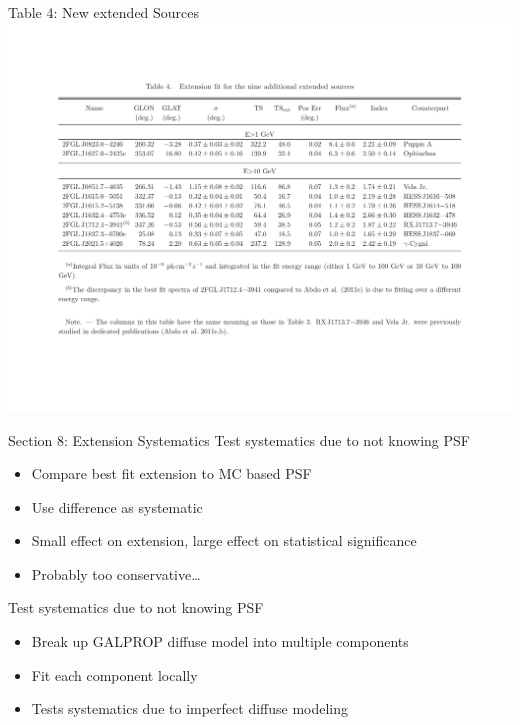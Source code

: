 \documentclass[12pt]{beamer}
\begin{document}
\begin{frame}{Table 4: New extended Sources}
    \includegraphics[scale=0.50]{plots/new_extended.pdf}
\end{frame}


\begin{frame}{Section 8: Extension Systematics}
  Test systematics due to not knowing PSF
  \begin{itemize}
    \item Compare best fit extension to 
      MC based PSF
    \item Use difference as systematic
    \item Small effect on extension, large effect on statistical 
      significance
    \item Probably too conservative\dots
  \end{itemize}
  Test systematics due to not knowing PSF
  \begin{itemize}
    \item Break up GALPROP diffuse model into multiple components 
    \item Fit each component locally
    \item Tests systematics due to imperfect diffuse modeling
  \end{itemize}
\end{frame}
\end{document}
